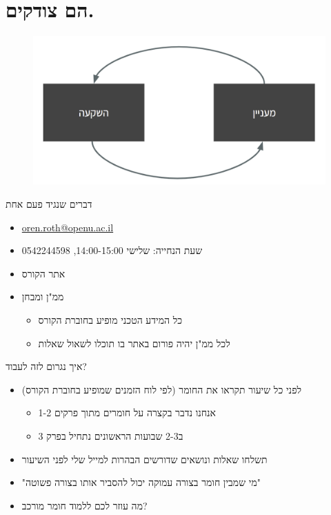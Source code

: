 \documentclass[handout]{beamer}
\begin{document}
  \section{הם צודקים.}
  \begin{frame}
  \begin{figure}
  	\centering
  	\includegraphics[width=1\linewidth]{imgs/hard}
  	\label{fig:hard}
  \end{figure}
  \end{frame}
\begin{frame}{דברים שנגיד פעם אחת}
\pause
\begin{itemize}[<+->]
	\item \url{oren.roth@openu.ac.il}
	\item שעת הנחייה: שלישי 14:00-15:00, 0542244598
	\item אתר הקורס
	\item   ממ"ן ומבחן
	\begin{itemize}[<+->]
		\item כל המידע הטכני מופיע בחוברת הקורס
		\item לכל ממ"ן יהיה פורום באתר בו תוכלו לשאול שאלות
	\end{itemize}
\end{itemize}
\end{frame}
\begin{frame}{איך נגרום לזה לעבוד?}
\pause
\begin{itemize}[<+->]
\item לפני כל שיעור תקראו את החומר (לפי לוח הזמנים שמופיע בחוברת הקורס)
	\begin{itemize}[<+->]
	\item  אנחנו נדבר בקצרה על חומרים מתוך פרקים  1-2
	\item ב2-3 שבועות הראשונים נתחיל בפרק 3
\end{itemize}
\item תשלחו שאלות ונושאים שדורשים הבהרות למייל שלי לפני השיעור
\item "מי שמבין חומר בצורה עמוקה יכול להסביר אותו בצורה פשוטה"
\item מה עוזר לכם ללמוד חומר מורכב?
\end{itemize}
\end{frame}
\end{document}
